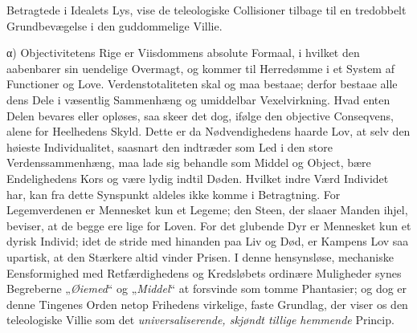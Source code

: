 \documentclass[12pt]{book}
\begin{document}
Betragtede i Idealets Lys, vise de teleologiske Collisioner tilbage til en tredobbelt
Grundbevægelse i den guddommelige Villie.

α) Objectivitetens Rige er Viisdommens absolute Formaal, i hvilket den aabenbarer sin
uendelige Overmagt, og kommer til Herredømme i et System af Functioner og Love.
Verdenstotaliteten skal og maa bestaae; derfor bestaae alle dens Dele i væsentlig
Sammenhæng og umiddelbar Vexelvirkning. Hvad enten Delen bevares eller opløses, saa
skeer det dog, ifølge den objective Conseqvens, alene for Heelhedens Skyld. Dette er
da Nødvendighedens haarde Lov, at selv den høieste Individualitet, saasnart den
indtræder som Led i den store Verdenssammenhæng, maa lade sig behandle som Middel og
Object, bære Endelighedens Kors og være lydig indtil Døden. Hvilket indre Værd
Individet har, kan fra dette Synspunkt aldeles ikke komme i Betragtning. For
Legemverdenen er Mennesket kun et Legeme; den Steen, der slaaer Manden ihjel, beviser,
at de begge ere lige for Loven. For det glubende Dyr er Mennesket kun et dyrisk
Individ; idet de stride med hinanden paa Liv og Død, er Kampens Lov saa upartisk, at
den Stærkere altid vinder Prisen. I denne hensynsløse, mechaniske Eensformighed med
Retfærdighedens og Kredsløbets ordinære Muligheder synes Begreberne „\emph{Øiemed}“ og
„\emph{Middel}“ at forsvinde som tomme Phantasier; og dog er denne Tingenes Orden netop
Frihedens virkelige, faste Grundlag, der viser os den teleologiske Villie som det
\emph{universaliserende, skjøndt tillige hemmende} Princip.
\end{document}

